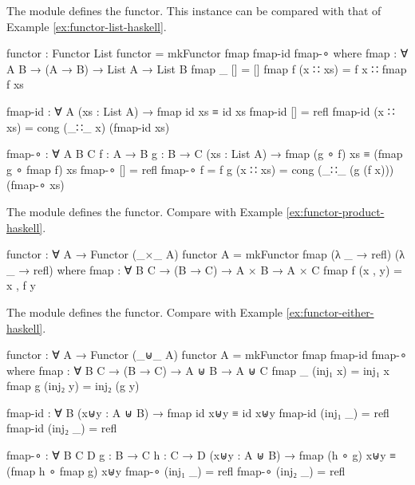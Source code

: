 \begin{example}
  \label{ex:functor-list-agda}

  The module  defines the 
  functor. This instance can be compared with that of Example
  \ref{ex:functor-list-haskell}.
  \begin{codeagda}
functor : Functor List
functor = mkFunctor fmap fmap-id fmap-∘
  where
    fmap : ∀ {A B} → (A → B) → List A → List B
    fmap _ []       = []
    fmap f (x ∷ xs) = f x ∷ fmap f xs

    fmap-id : ∀ {A} (xs : List A) → fmap id xs ≡ id xs
    fmap-id []       = refl
    fmap-id (x ∷ xs) = cong (_∷_ x) (fmap-id xs)

    fmap-∘ : ∀ {A B C} {f : A → B} {g : B → C}
             (xs : List A) → fmap (g ∘ f) xs ≡ (fmap g ∘ fmap f) xs
    fmap-∘             []       = refl
    fmap-∘ {f = f} {g} (x ∷ xs) = cong (_∷_ (g (f x))) (fmap-∘ xs)
    \end{codeagda}

\end{example}

\begin{example}
  \label{ex:functor-product-agda}

  The module  defines the
   functor. Compare with Example
  \ref{ex:functor-product-haskell}.
  \begin{codeagda}
functor : ∀ {A} → Functor (_×_ A)
functor {A} = mkFunctor fmap (λ _ → refl) (λ _ → refl)
  where
    fmap : ∀ {B C} → (B → C) → A × B → A × C
    fmap f (x , y) = x , f y
  \end{codeagda}

\end{example}

\begin{example}
  \label{ex:functor-sum-agda}

  The module  defines the
   functor. Compare with Example
  \ref{ex:functor-either-haskell}.
  \begin{codeagda}
functor : ∀ {A} → Functor (_⊎_ A)
functor {A} = mkFunctor fmap fmap-id fmap-∘
  where
    fmap : ∀ {B C} → (B → C) → A ⊎ B → A ⊎ C
    fmap _ (inj₁ x) = inj₁ x
    fmap g (inj₂ y) = inj₂ (g y)

    fmap-id : ∀ {B} (x⊎y : A ⊎ B) → fmap id x⊎y ≡ id x⊎y
    fmap-id (inj₁ _) = refl
    fmap-id (inj₂ _) = refl

    fmap-∘ : ∀ {B C D} {g : B → C} {h : C → D}
             (x⊎y : A ⊎ B) → fmap (h ∘ g) x⊎y ≡ (fmap h ∘ fmap g) x⊎y
    fmap-∘ (inj₁ _) = refl
    fmap-∘ (inj₂ _) = refl
    \end{codeagda}

\end{example}

